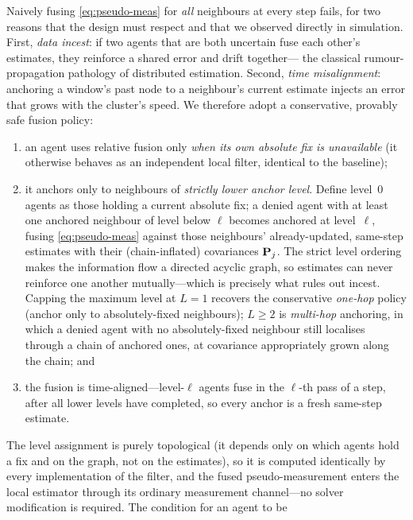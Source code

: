 Naively fusing \cref{eq:pseudo-meas} for \emph{all} neighbours at every step
fails, for two reasons that the design must respect and that we observed directly
in simulation. First, \emph{data incest}: if two agents that are both uncertain
fuse each other's estimates, they reinforce a shared error and drift together---%
the classical rumour-propagation pathology of distributed estimation. Second,
\emph{time misalignment}: anchoring a window's past node to a neighbour's current
estimate injects an error that grows with the cluster's speed. We therefore adopt
a conservative, provably safe fusion policy:
\begin{enumerate}[nosep,leftmargin=1.6em]
  \item an agent uses relative fusion only \emph{when its own absolute fix is
        unavailable} (it otherwise behaves as an independent local filter,
        identical to the baseline);
  \item it anchors only to neighbours of \emph{strictly lower anchor level}.
        Define level~$0$ agents as those holding a current absolute fix; a
        denied agent with at least one anchored neighbour of level below $\ell$
        becomes anchored at level~$\ell$, fusing \cref{eq:pseudo-meas} against
        those neighbours' already-updated, same-step estimates with their
        (chain-inflated) covariances $\mathbf{P}_j$. The strict level ordering
        makes the information flow a directed acyclic graph, so estimates can
        never reinforce one another mutually---which is precisely what rules
        out incest. Capping the maximum level at $L{=}1$ recovers the
        conservative \emph{one-hop} policy (anchor only to absolutely-fixed
        neighbours); $L\ge2$ is \emph{multi-hop} anchoring, in which a denied
        agent with no absolutely-fixed neighbour still localises through a
        chain of anchored ones, at covariance appropriately grown along the
        chain; and
  \item the fusion is time-aligned---level-$\ell$ agents fuse in the
        $\ell$-th pass of a step, after all lower levels have completed, so
        every anchor is a fresh same-step estimate.
\end{enumerate}
The level assignment is purely topological (it depends only on which agents
hold a fix and on the graph, not on the estimates), so it is computed
identically by every implementation of the filter, and the fused
pseudo-measurement enters the local estimator through its ordinary measurement
channel---no solver modification is required. The condition for an agent to be
